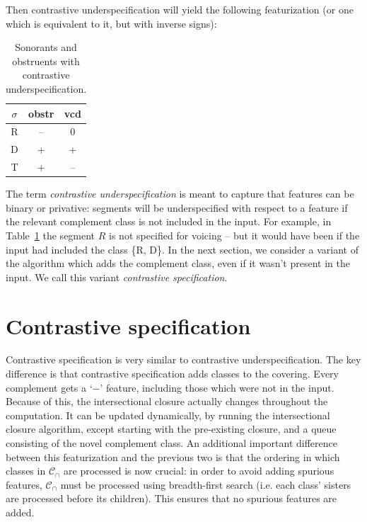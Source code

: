 \documentclass[11pt, oneside]{article}   	%
\begin{document}
\noindent Then contrastive underspecification will yield the following featurization (or one which is equivalent to it, but with inverse signs):

\begin{table}[h]
    \centering
    \begin{tabular} {|c||c|c|}
    \hline
        $\sigma$ & obstr & vcd \\ \hline
        R & -- & 0 \\
        D & + & + \\
        T & + & -- \\
        \hline
    \end{tabular}
    \caption{Sonorants and obstruents with contrastive underspecification.}
    \label{table:underspecification}
\end{table}

The term \textit{contrastive underspecification} is meant to capture that features can be binary or privative: segments will be underspecified with respect to a feature if the relevant complement class is not included in the input. For example, in Table~\ref{table:underspecification} the segment $R$ is not specified for voicing -- but it would have been if the input had included the class \{R, D\}. In the next section, we consider a variant of the algorithm which adds the complement class, even if it wasn't present in the input. We call this variant \textit{contrastive specification}.
    
\section{Contrastive specification}

Contrastive specification is very similar to contrastive underspecification. The key difference is that contrastive specification adds classes to the covering. Every complement gets a `$-$' feature, including those which were not in the input. Because of this, the intersectional closure actually changes throughout the computation. It can be updated dynamically, by running the intersectional closure algorithm, except starting with the pre-existing closure, and a queue consisting of the novel complement class. An additional important difference between this featurization and the previous two is that the ordering in which classes in $\mathcal{C_\cap}$ are processed is now crucial: in order to avoid adding spurious features, $\mathcal{C_\cap}$ must be processed using breadth-first search (i.e. each class' sisters are processed before its children). This ensures that no spurious features are added.
\end{document}
